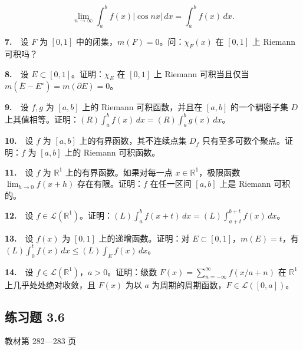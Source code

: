 \documentclass[11pt,a4paper]{article}
\begin{document}
\[
\lim_{n\to\infty}\int_a^b f(x)|\cos nx|\,dx=\int_a^b f(x)\,dx.
\]

\par{}\noindent \textbf{7.}　设 \(F\) 为 \([0,1]\) 中的闭集，\(m(F)=0\)。问：\(\chi_F(x)\) 在 \([0,1]\) 上 Riemann 可积吗？

\par{}\noindent \textbf{8.}　设 \(E\subset[0,1]\)。证明：\(\chi_E\) 在 \([0,1]\) 上 Riemann 可积当且仅当 \(m(\overline E-E^\circ)=m(\partial E)=0\)。

\par{}\noindent \textbf{9.}　设 \(f,g\) 为 \([a,b]\) 上的 Riemann 可积函数，并且在 \([a,b]\) 的一个稠密子集 \(D\) 上其值相等。证明：\((R)\int_a^b f(x)\,dx=(R)\int_a^b g(x)\,dx\)。

\par{}\noindent \textbf{10.}　设 \(f\) 为 \([a,b]\) 上的有界函数，其不连续点集 \(D_f\) 只有至多可数个聚点。证明：\(f\) 为 \([a,b]\) 上的 Riemann 可积函数。

\par{}\noindent \textbf{11.}　设 \(f\) 为 \(\mathbb R^1\) 上的有界函数。如果对每一点 \(x\in\mathbb R^1\)，极限函数 \(\lim_{h\to0} f(x+h)\) 存在有限。证明：\(f\) 在任一区间 \([a,b]\) 上是 Riemann 可积的。

\par{}\noindent \textbf{12.}　设 \(f\in\mathcal L(\mathbb R^1)\)。证明：\((L)\int_a^b f(x+t)\,dx=(L)\int_{a+t}^{b+t}f(x)\,dx\)。

\par{}\noindent \textbf{13.}　设 \(f(x)\) 为 \([0,1]\) 上的递增函数。证明：对 \(E\subset[0,1]\)，\(m(E)=t\)，有 \((L)\int_0^t f(x)\,dx\le(L)\int_E f(x)\,dx\)。

\par{}\noindent \textbf{14.}　设 \(f\in\mathcal L(\mathbb R^1)\)，\(a>0\)。证明：级数 \(F(x)=\sum_{n=-\infty}^{\infty}f(x/a+n)\) 在 \(\mathbb R^1\) 上几乎处处绝对收敛，且 \(F(x)\) 为以 \(a\) 为周期的周期函数，\(F\in\mathcal L([0,a])\)。


\hypertarget{ex6}{}\subsection*{练习题 3.6}
\noindent 教材第 282—283 页
\end{document}
